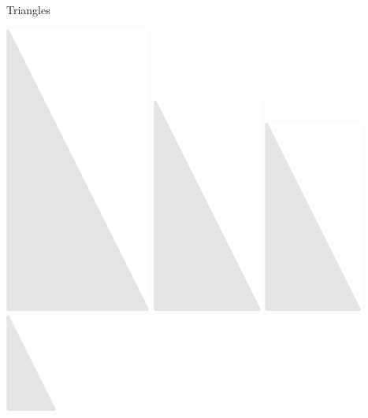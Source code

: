 \documentclass[14pt]{beamer}
\begin{document}
\begin{frame}{Triangles}
\begin{center}
            \includegraphics[scale=0.3]{figures/figure024d.pdf}\quad
            \includegraphics[scale=0.3]{figures/figure024c.pdf}\quad
            \includegraphics[scale=0.3]{figures/figure024b.pdf}\quad
            \includegraphics[scale=0.3]{figures/figure024a.pdf}\\\bigskip\bigskip


\end{center}
\end{frame}
\end{document}
